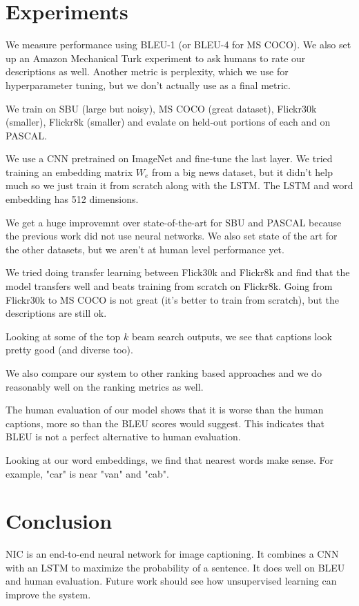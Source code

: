 \documentclass[a4paper]{article}
\begin{document}
\section{Experiments}
We measure performance using BLEU-1 (or BLEU-4 for MS COCO). We also set up
an Amazon Mechanical Turk experiment to ask humans to rate our descriptions
as well. Another metric is perplexity, which we use for hyperparameter tuning,
but we don't actually use as a final metric.

We train on SBU (large but noisy), MS COCO (great dataset), Flickr30k (smaller),
Flickr8k (smaller) and evalate on held-out portions of each and on PASCAL.

We use a CNN pretrained on ImageNet and fine-tune the last layer.
We tried training an embedding matrix $W_e$
from a big news dataset, but it didn't help much so we just train it from
scratch along with the LSTM. The LSTM and word embedding has 512 dimensions.

We get a huge improvemnt over state-of-the-art for SBU and PASCAL because the
previous work did not use neural networks. We also set state of the art for the
other datasets, but we aren't at human level performance yet.

We tried doing transfer learning between Flick30k and Flickr8k and find that
the model transfers well and beats training from scratch on Flickr8k.
Going from Flickr30k to MS COCO is not great (it's better to train from
scratch), but the descriptions are still ok.

Looking at some of the top $k$ beam search outputs, we see that captions look
pretty good (and diverse too).

We also compare our system to other ranking based approaches and we do
reasonably well on the ranking metrics as well.

The human evaluation of our model shows that it is worse than the human
captions, more so than the BLEU scores would suggest. This indicates that
BLEU is not a perfect alternative to human evaluation.

Looking at our word embeddings, we find that nearest words make sense. For
example, "car" is near "van" and "cab".

\section{Conclusion}
NIC is an end-to-end neural network for image captioning. It combines a CNN
with an LSTM to maximize the probability of a sentence. It does well on BLEU
and human evaluation. Future work should see how unsupervised learning can
improve the system.
\end{document}
